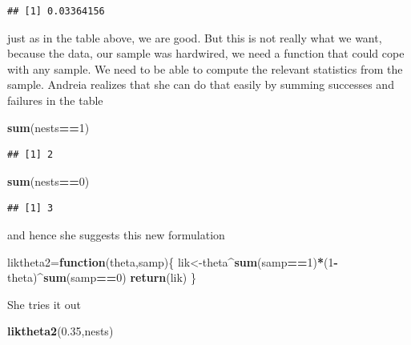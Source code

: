 \documentclass[
]{book}
\newenvironment{Shaded}{\begin{snugshade}}{\end{snugshade}}
\newcommand{\ControlFlowTok}[1]{\textcolor[rgb]{0.13,0.29,0.53}{\textbf{#1}}}
\newcommand{\DecValTok}[1]{\textcolor[rgb]{0.00,0.00,0.81}{#1}}
\newcommand{\FloatTok}[1]{\textcolor[rgb]{0.00,0.00,0.81}{#1}}
\newcommand{\KeywordTok}[1]{\textcolor[rgb]{0.13,0.29,0.53}{\textbf{#1}}}
\newcommand{\NormalTok}[1]{#1}
\newcommand{\OperatorTok}[1]{\textcolor[rgb]{0.81,0.36,0.00}{\textbf{#1}}}
\begin{document}
\begin{verbatim}
## [1] 0.03364156
\end{verbatim}

just as in the table above, we are good. But this is not really what we want, because the data, our sample was hardwired, we need a function that could cope with any sample. We need to be able to compute the relevant statistics from the sample. Andreia realizes that she can do that easily by summing successes and failures in the table

\begin{Shaded}
\begin{Highlighting}[]
\KeywordTok{sum}\NormalTok{(nests}\OperatorTok{==}\DecValTok{1}\NormalTok{)}
\end{Highlighting}
\end{Shaded}

\begin{verbatim}
## [1] 2
\end{verbatim}

\begin{Shaded}
\begin{Highlighting}[]
\KeywordTok{sum}\NormalTok{(nests}\OperatorTok{==}\DecValTok{0}\NormalTok{)}
\end{Highlighting}
\end{Shaded}

\begin{verbatim}
## [1] 3
\end{verbatim}

and hence she suggests this new formulation

\begin{Shaded}
\begin{Highlighting}[]
\NormalTok{liktheta2=}\ControlFlowTok{function}\NormalTok{(theta,samp)\{}
\NormalTok{  lik<-theta}\OperatorTok{^}\KeywordTok{sum}\NormalTok{(samp}\OperatorTok{==}\DecValTok{1}\NormalTok{)}\OperatorTok{*}\NormalTok{(}\DecValTok{1}\OperatorTok{-}\NormalTok{theta)}\OperatorTok{^}\KeywordTok{sum}\NormalTok{(samp}\OperatorTok{==}\DecValTok{0}\NormalTok{)}
  \KeywordTok{return}\NormalTok{(lik)}
\NormalTok{\}}
\end{Highlighting}
\end{Shaded}

She tries it out

\begin{Shaded}
\begin{Highlighting}[]
\KeywordTok{liktheta2}\NormalTok{(}\FloatTok{0.35}\NormalTok{,nests)}
\end{Highlighting}
\end{Shaded}
\end{document}
